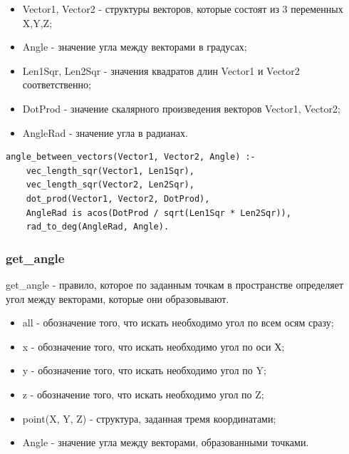 \begin{itemize}
	\item Vector1, Vector2 - структуры векторов, которые состоят из 3 переменных X,Y,Z;
	\item Angle - значение угла между векторами в градусах;
	\item Len1Sqr, Len2Sqr - значения квадратов длин Vector1 и Vector2 соответственно;
	\item DotProd - значение скалярного произведения векторов Vector1, Vector2;
	\item AngleRad - значение угла в радианах.
\end{itemize}

\begin{lstlisting}[caption=Реализация правила angle\_between\_vectors, label=rules:anglebetweenvectors]
angle_between_vectors(Vector1, Vector2, Angle) :-
	vec_length_sqr(Vector1, Len1Sqr),
	vec_length_sqr(Vector2, Len2Sqr),
	dot_prod(Vector1, Vector2, DotProd),
	AngleRad is acos(DotProd / sqrt(Len1Sqr * Len2Sqr)),
	rad_to_deg(AngleRad, Angle).
\end{lstlisting}

\subsubsection{get\_angle}
\hspace{0.6cm} get\_angle - правило, которое по заданным точкам в пространстве определяет угол между векторами, которые они образовывают.

\begin{itemize}
	\item all - обозначение того, что искать необходимо угол по всем осям сразу;
	\item x - обозначение того, что искать необходимо угол по оси Х;
	\item y - обозначение того, что искать необходимо угол по Y;
	\item z - обозначение того, что искать необходимо угол по Z;
	\item point(X, Y, Z) - структура, заданная тремя координатами;
	\item Angle - значение угла между векторами, образованными точками.
\end{itemize}


